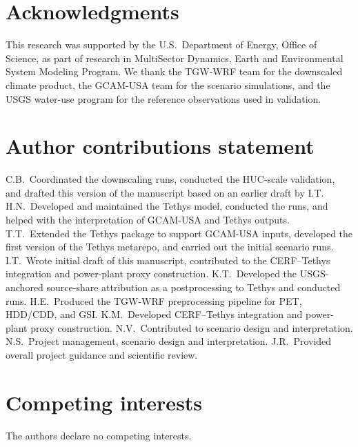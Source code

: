 \documentclass[fleqn,10pt]{wlscirep}
\begin{document}
\section*{Acknowledgments}

This research was supported by the U.S.~Department of Energy, Office of Science, as part of research in MultiSector Dynamics, Earth and Environmental System Modeling Program. We thank the TGW-WRF team for the downscaled climate product, the GCAM-USA team for the scenario simulations, and the USGS water-use program for the reference observations used in validation.

\section*{Author contributions statement}

C.B.~Coordinated the downscaling runs, conducted the HUC-scale validation, and drafted this version of the manuscript based on an earlier draft by I.T.
H.N.~Developed and maintained the Tethys model, conducted the runs, and helped with the interpretation of GCAM-USA and Tethys outputs.
T.T.~Extended the Tethys package to support GCAM-USA inputs, developed the first version of the Tethys metarepo, and carried out the initial scenario runs.
I.T.~Wrote initial draft of this manuscript, contributed to the CERF--Tethys integration and power-plant proxy construction.
K.T.~Developed the USGS-anchored source-share attribution as a postprocessing to Tethys and conducted runs.
H.E.~Produced the TGW-WRF preprocessing pipeline for PET, HDD/CDD, and GSI.
K.M.~Developed CERF--Tethys integration and power-plant proxy construction.
N.V.~Contributed to scenario design and interpretation.
N.S.~Project management, scenario design and interpretation.
J.R.~Provided overall project guidance and scientific review.

\section*{Competing interests}

The authors declare no competing interests.


\end{document}
